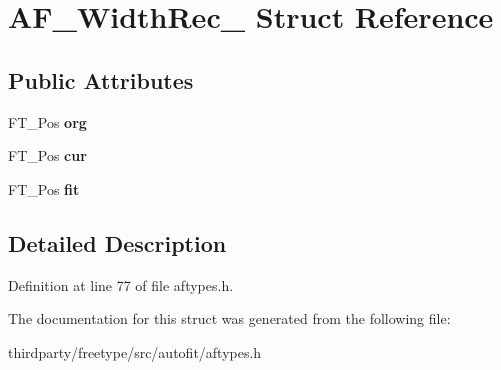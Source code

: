 \hypertarget{struct_a_f___width_rec__}{}\section{A\+F\+\_\+\+Width\+Rec\+\_\+ Struct Reference}
\label{struct_a_f___width_rec__}
\subsection*{Public Attributes}
\begin{DoxyCompactItemize}
\item 
\mbox{\label{struct_a_f___width_rec___a60bed8128a114e3c6d468a6cf826221f}} 
F\+T\+\_\+\+Pos {\bfseries org}
\item 
\mbox{\label{struct_a_f___width_rec___a07d632f5b3c38eace8193872d752e1d1}} 
F\+T\+\_\+\+Pos {\bfseries cur}
\item 
\mbox{\label{struct_a_f___width_rec___a3f6b53859bb839057ae22345627969f7}} 
F\+T\+\_\+\+Pos {\bfseries fit}
\end{DoxyCompactItemize}


\subsection{Detailed Description}


Definition at line 77 of file aftypes.\+h.



The documentation for this struct was generated from the following file\+:\begin{DoxyCompactItemize}
\item 
thirdparty/freetype/src/autofit/aftypes.\+h\end{DoxyCompactItemize}
